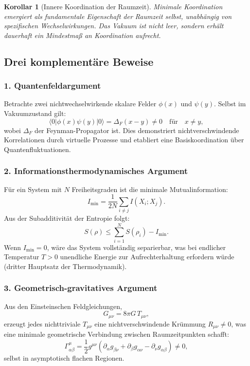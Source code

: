 \documentclass[11pt,a4paper]{article}
\newtheorem{corollary}{Korollar}
\begin{document}
	\begin{corollary}[Innere Koordination der Raumzeit]
		Minimale Koordination emergiert als fundamentale Eigenschaft der Raumzeit selbst, unabhängig von spezifischen Wechselwirkungen. Das Vakuum ist nicht leer, sondern erhält dauerhaft ein Mindestmaß an Koordination aufrecht.
	\end{corollary}
	
	\subsection{Drei komplementäre Beweise}
	
	\subsubsection*{1. Quantenfeldargument}
	Betrachte zwei nichtwechselwirkende skalare Felder \(\phi(x)\) und \(\psi(y)\). Selbst im Vakuumzustand gilt:
	\[
	\langle 0 | \phi(x) \psi(y) | 0 \rangle = \Delta_F(x-y) \neq 0 \quad
	\text{für} \quad x \neq y,
	\]
	wobei \(\Delta_F\) der Feynman-Propagator ist. Dies demonstriert nichtverschwindende Korrelationen durch virtuelle Prozesse und etabliert eine Basiskoordination über Quantenfluktuationen.
	
	\subsubsection*{2. Informationsthermodynamisches Argument}
	Für ein System mit \(N\) Freiheitsgraden ist die minimale Mutualinformation:
	\[
	I_{\min} = \frac{1}{2N} \sum_{i \neq j} I(X_i; X_j).
	\]
	Aus der Subadditivität der Entropie folgt:
	\[
	S(\rho) \leq \sum_{i=1}^N S(\rho_i) - I_{\min}.
	\]
	Wenn \(I_{\min}=0\), wäre das System vollständig separierbar, was bei endlicher Temperatur \(T>0\) unendliche Energie zur Aufrechterhaltung erfordern würde (dritter Hauptsatz der Thermodynamik).
	
	\subsubsection*{3. Geometrisch-gravitatives Argument}
	Aus den Einsteinschen Feldgleichungen,
	\[
	G_{\mu\nu} = 8\pi G \, T_{\mu\nu},
	\]
	erzeugt jedes nichttriviale \(T_{\mu\nu}\) eine nichtverschwindende Krümmung \(R_{\mu\nu} \neq 0\), was eine minimale geometrische Verbindung zwischen Raumzeitpunkten schafft:
	\[
	\Gamma^{\mu}_{\alpha\beta} = \frac{1}{2} g^{\mu\nu}(\partial_\alpha g_{\beta\nu}
	+ \partial_\beta g_{\alpha\nu} - \partial_\nu g_{\alpha\beta}) \neq 0,
	\]
	selbst in asymptotisch flachen Regionen.
	
\end{document}
